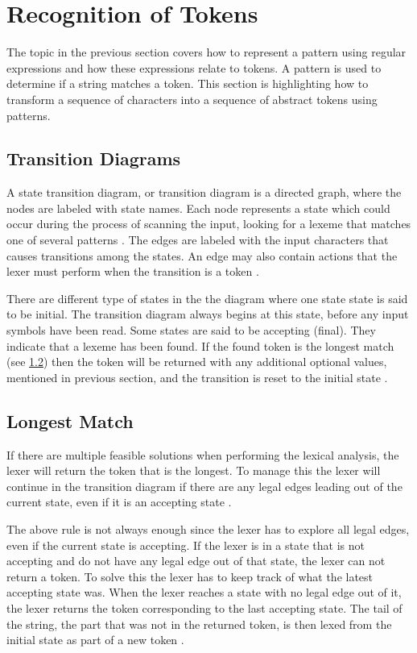 \section{Recognition of Tokens}
The topic in the previous section covers how to represent a pattern using 
regular expressions and how these expressions relate to tokens. A pattern is
used to determine if a string matches a token. This section is highlighting how
to transform a sequence of characters into a sequence of abstract tokens using
patterns. 

\subsection{Transition Diagrams}
A state transition diagram, or transition diagram is a directed graph, where the
nodes are labeled with state names. Each node represents a state which could
occur during the process of scanning the input, looking for a lexeme that
matches one of several patterns \cite{Aho2006}. The edges are labeled with the
input characters that causes transitions among the states. An edge may also
contain actions that the lexer must perform when the transition is a token 
\cite{sebesta2012}.

There are different type of states in the the diagram where one state state is said to be initial. The transition diagram always begins at this state, before any input symbols have been read. Some states are said to be accepting (final). They indicate that a lexeme has been found. If the found token is the longest match (see \cref{sub:longmatch}) then the token will be returned with any additional optional values, mentioned in previous section, and the transition is reset to the initial state \cite{Aho2006}.

\subsection{Longest Match}\label{sub:longmatch}
If there are multiple feasible solutions when performing the lexical
analysis, the lexer will return the token that is the longest. To manage this
the lexer will continue in the transition diagram if there are any legal edges
leading out of the current state, even if it is an accepting state \cite{Aho2006}.

The above rule is not always enough since the lexer has to explore all legal
edges, even if the current state is accepting. If the lexer is in a state that
is not accepting and do not have any legal edge out of that state, the lexer
can not return a token. To solve this the lexer has to keep track of what the
latest accepting state was. When the lexer reaches a state with no
legal edge out of it, the lexer returns the token corresponding to the last
accepting state. The tail of the string, the part that was not in the returned
token, is then lexed from the initial state as part of a new token
\cite{Aho2006}.

